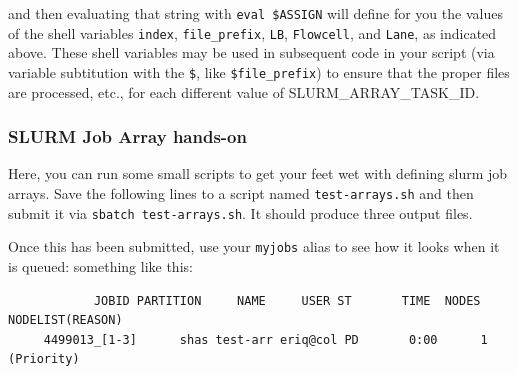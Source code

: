 \documentclass[]{krantz}
\makeatletter
\newenvironment{Shaded}{\begin{snugshade}}{\end{snugshade}}
\newcommand{\BuiltInTok}[1]{#1}
\newcommand{\CommentTok}[1]{\textcolor[rgb]{0.37,0.37,0.37}{\textit{#1}}}
\newcommand{\FunctionTok}[1]{\textcolor[rgb]{0,0,0}{#1}}
\newcommand{\NormalTok}[1]{#1}
\newcommand{\StringTok}[1]{\textcolor[rgb]{0.5,0.5,0.5}{#1}}
\newcommand{\VariableTok}[1]{\textcolor[rgb]{0,0,0}{#1}}
\newenvironment{kframe}{%
\medskip{}
\setlength{\fboxsep}{.8em}
 \def\at@end@of@kframe{}%
 \ifinner\ifhmode%
  \def\at@end@of@kframe{\end{minipage}}%
  \begin{minipage}{\columnwidth}%
 \fi\fi%
 \def\FrameCommand##1{\hskip\@totalleftmargin \hskip-\fboxsep
 \colorbox{shadecolor}{##1}\hskip-\fboxsep
     \hskip-\linewidth \hskip-\@totalleftmargin \hskip\columnwidth}%
 \MakeFramed {\advance\hsize-\width
   \@totalleftmargin\z@ \linewidth\hsize
   \@setminipage}}%
 {\par\unskip\endMakeFramed%
 \at@end@of@kframe}
\renewenvironment{Shaded}{\begin{kframe}}{\end{kframe}}
\makeatother
\begin{document}
and then evaluating that string with \texttt{eval\ \$ASSIGN} will define for you the values of the
shell variables \texttt{index}, \texttt{file\_prefix}, \texttt{LB}, \texttt{Flowcell}, and \texttt{Lane}, as indicated
above. These shell variables may be used in subsequent code in your script
(via variable subtitution with the \texttt{\$}, like \texttt{\$file\_prefix}) to ensure that the
proper files are processed, etc., for each different value of SLURM\_ARRAY\_TASK\_ID.

\hypertarget{slurm-job-array-hands-on}{%
\subsubsection{SLURM Job Array hands-on}\label{slurm-job-array-hands-on}}

Here, you can run some small scripts to get your feet wet with
defining slurm job arrays. Save the following lines to a script
named \texttt{test-arrays.sh} and then submit it via \texttt{sbatch\ test-arrays.sh}.
It should produce three output files.

\begin{Shaded}
\end{Shaded}

Once this has been submitted, use your \texttt{myjobs} alias to see how it looks
when it is queued: something like this:

\begin{verbatim}
            JOBID PARTITION     NAME     USER ST       TIME  NODES NODELIST(REASON)
     4499013_[1-3]      shas test-arr eriq@col PD       0:00      1 (Priority)
\end{verbatim}
\end{document}
